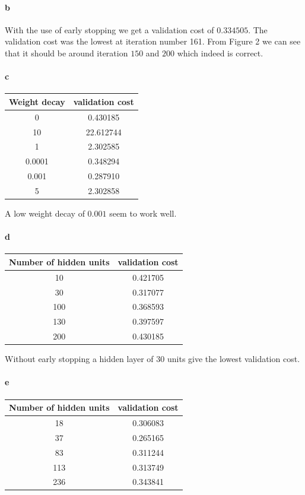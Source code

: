 \documentclass{article}
\begin{document}
\paragraph{b}

With the use of early stopping we get a validation cost of $0.334505$.
The validation cost was the lowest at iteration number 161.
 From Figure 2 we can see that it should be around iteration $150$ and $200$ which indeed is correct.

\paragraph{c}

\begin{tabular}{c | c}
  Weight decay & validation cost\\
  \hline
  0 & 0.430185\\
  \hline
  10 & 22.612744\\
  \hline
  1 & 2.302585\\
  \hline
  0.0001 & 0.348294\\
  \hline
  0.001 & 0.287910\\
  \hline
  5 & 2.302858\\
\end{tabular}

A low weight decay of $0.001$ seem to work well.

\paragraph{d}

\begin{tabular}{c | c}
  Number of hidden units & validation cost\\
  \hline
  10 & 0.421705\\
  \hline
  30 & 0.317077\\
  \hline
  100 & 0.368593\\
  \hline
  130 & 0.397597\\
  \hline
  200 & 0.430185\\
\end{tabular}

Without early stopping a hidden layer of $30$ units give the lowest
validation cost.

\paragraph{e}

\begin{tabular}{c | c}
  Number of hidden units & validation cost\\
  \hline
  18 & 0.306083\\
  \hline
  37 & 0.265165\\
  \hline
  83 & 0.311244\\
  \hline
  113 & 0.313749\\
  \hline
  236 & 0.343841\\
\end{tabular}
\end{document}
